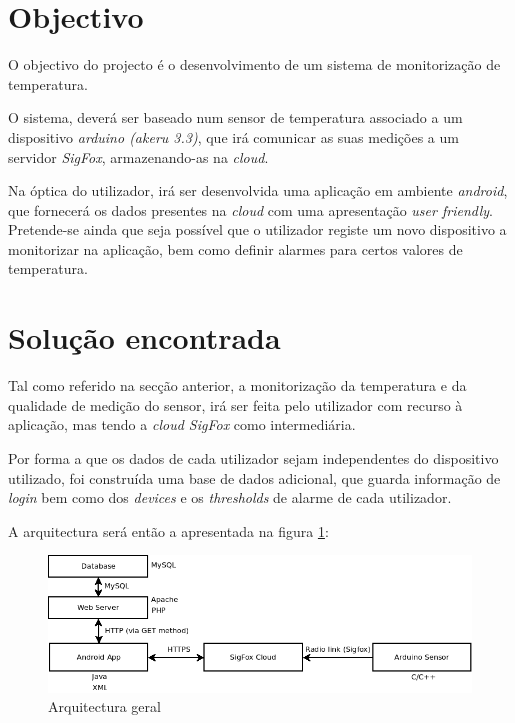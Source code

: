 \documentclass[a4paper]{article}
\begin{document}


\tableofcontents
{}
\pagebreak

\section{Objectivo}

O objectivo do projecto é o desenvolvimento de um sistema de monitorização de temperatura. 

O sistema, deverá ser baseado num sensor de temperatura associado a um dispositivo \textit{arduino (akeru 3.3)}, que irá comunicar as suas medições a um servidor \textit{SigFox}, armazenando-as na \textit{cloud}.

Na óptica do utilizador, irá ser desenvolvida uma aplicação em ambiente \textit{android}, que fornecerá os dados presentes na \textit{cloud} com uma apresentação \textit{user friendly}. Pretende-se ainda que seja possível que o utilizador registe um novo dispositivo a monitorizar na aplicação, bem como definir alarmes para certos valores de temperatura.


\section{Solução encontrada}

Tal como referido na secção anterior, a monitorização da temperatura e da qualidade de medição do sensor, irá ser feita pelo utilizador com recurso à aplicação, mas tendo a \textit{cloud SigFox} como intermediária.

Por forma a que os dados de cada utilizador sejam independentes do dispositivo utilizado, foi construída uma base de dados adicional, que guarda informação de \textit{login} bem como dos \textit{devices} e os \textit{thresholds} de alarme de cada utilizador.

A arquitectura será então a apresentada na figura \ref{fig:general}:
\vspace{2mm}

\begin{figure}[hb]
  \centering
  \includegraphics[scale=0.45]{general.png}
  \caption{Arquitectura geral}
  \label{fig:general}
\end{figure}
\end{document}
